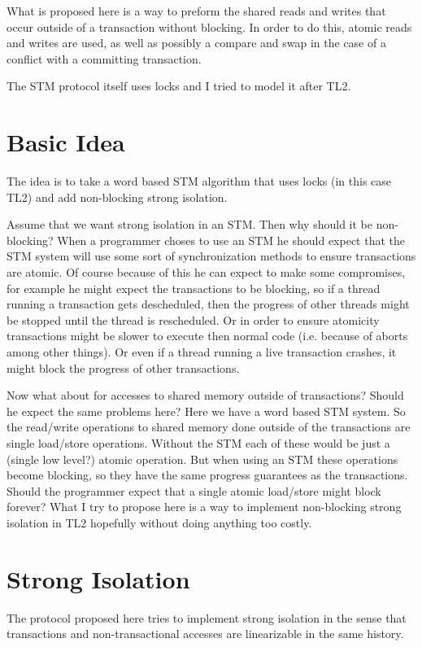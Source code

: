 \documentclass[11pt]{article}
\begin{document}
What is proposed here is a way to preform the shared reads and writes that occur outside of a transaction
without blocking.
In order to do this, atomic reads and writes are used, as well as possibly a compare and swap in the case
of a conflict with a committing transaction.

The STM protocol itself uses locks and I tried to model it after TL2.


\section{Basic Idea}
The idea is to take a word based STM algorithm that uses locks (in this case TL2) and add non-blocking strong isolation.

Assume that we want strong isolation in an STM.  Then why should it be non-blocking?
When a programmer choses to use an STM he should expect that the STM system will use some sort of synchronization methods to ensure
transactions are atomic.
Of course because of this he can expect to make some compromises, for example he might expect the transactions to be blocking, so
if a thread running a transaction gets descheduled, then the progress of other threads might be stopped until the thread is rescheduled.
Or in order to ensure atomicity transactions might be slower to execute then normal code (i.e. because of aborts among other things).
Or even if a thread running a live transaction crashes, it might block the progress of other transactions.

Now what about for accesses to shared memory outside of transactions?
Should he expect the same problems here?
Here we have a word based STM system.
So the read/write operations to shared memory done outside of the transactions are single load/store operations.
Without the STM each of these would be just a (single low level?) atomic operation.
But when using an STM these operations become blocking, so they have the same progress guarantees as the transactions.
Should the programmer expect that a single atomic load/store might block forever?
What I try to propose here is a way to implement non-blocking strong isolation in TL2 hopefully without doing anything too costly.

\section{Strong Isolation}
The protocol proposed here tries to implement strong isolation in the sense that transactions and non-transactional accesses are
linearizable in the same history.
\end{document}
